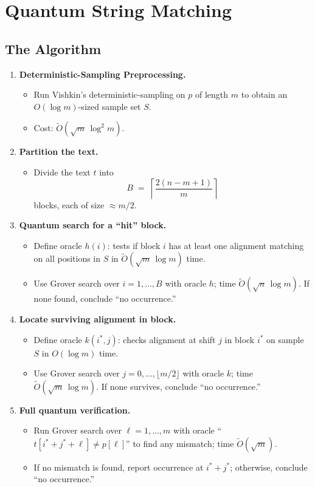 \documentclass[12pt]{IEEEtran}
\begin{document}
\section{Quantum String Matching}
\subsection{The Algorithm}
\begin{enumerate}
    \item \textbf{Deterministic-Sampling Preprocessing.}
          \begin{itemize}
              \item Run Vishkin's deterministic-sampling on \(p\) of length \(m\) to obtain an \(O(\log m)\)-sized sample set \(S\).
              \item Cost: \(\widetilde O(\sqrt{m}\,\log^2 m)\).
          \end{itemize}
    \item \textbf{Partition the text.}
          \begin{itemize}
              \item Divide the text \(t\) into
                    \[
                        B \;=\; \left\lceil \frac{2(n - m + 1)}{m} \right\rceil
                    \]
                    blocks, each of size \(\approx m/2\).
          \end{itemize}
    \item \textbf{Quantum search for a ``hit'' block.}
          \begin{itemize}
              \item Define oracle \(h(i)\): tests if block \(i\) has at least one alignment matching on all positions in \(S\) in \(\widetilde O(\sqrt{m}\,\log m)\) time.
              \item Use Grover search over \(i=1,\dots,B\) with oracle \(h\); time \(\widetilde O(\sqrt{n}\,\log m)\). If none found, conclude ``no occurrence.''
          \end{itemize}
    \item \textbf{Locate surviving alignment in block.}
          \begin{itemize}
              \item Define oracle \(k(i^*,j)\): checks alignment at shift \(j\) in block \(i^*\) on sample \(S\) in \(O(\log m)\) time.
              \item Use Grover search over \(j=0,\dots,\lfloor m/2\rfloor\) with oracle \(k\); time \(\widetilde O(\sqrt{m}\,\log m)\). If none survives, conclude ``no occurrence.''
          \end{itemize}
    \item \textbf{Full quantum verification.}
          \begin{itemize}
              \item Run Grover search over \(\ell=1,\dots,m\) with oracle ``\(t[i^*+j^*+\ell]\neq p[\ell]\)'' to find any mismatch; time \(\widetilde O(\sqrt{m})\).
              \item If no mismatch is found, report occurrence at \(i^*+j^*\); otherwise, conclude ``no occurrence.''
          \end{itemize}
\end{enumerate}
\end{document}
